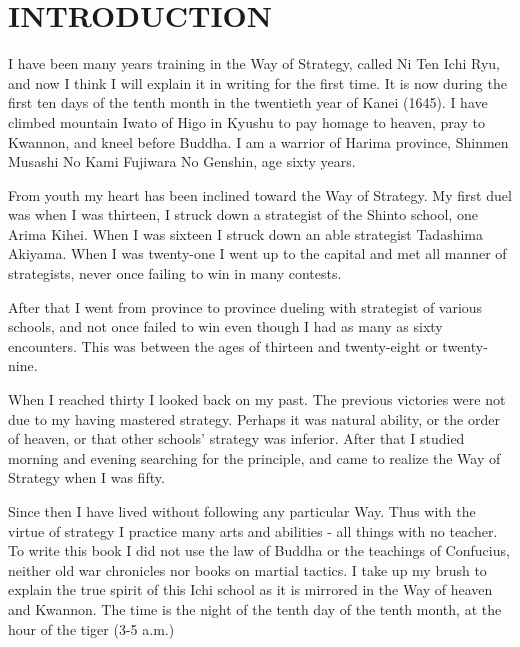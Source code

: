 \chapter{INTRODUCTION}

I have been many years training in the Way of Strategy, called Ni Ten Ichi Ryu, and now I think I will explain it in writing for the first time. It is now during the first ten days of the tenth month in the twentieth year of Kanei (1645). I have climbed mountain Iwato of Higo in Kyushu to pay homage to heaven, pray to Kwannon, and kneel before Buddha. I am a warrior of Harima province, Shinmen Musashi No Kami Fujiwara No Genshin, age sixty years.

From youth my heart has been inclined toward the Way of Strategy. My first duel was when I was thirteen, I struck down a strategist of the Shinto school, one Arima Kihei. When I was sixteen I struck down an able strategist Tadashima Akiyama. When I was twenty-one I went up to the capital and met all manner of strategists, never once failing to win in many contests.

After that I went from province to province dueling with strategist of various schools, and not once failed to win even though I had as many as sixty encounters. This was between the ages of thirteen and twenty-eight or twenty-nine.

When I reached thirty I looked back on my past. The previous victories were not due to my having mastered strategy. Perhaps it was natural ability, or the order of heaven, or that other schools' strategy was inferior. After that I studied morning and evening searching for the principle, and came to realize the Way of Strategy when I was fifty.

Since then I have lived without following any particular Way. Thus with the virtue of strategy I practice many arts and abilities - all things with no teacher. To write this book I did not use the law of Buddha or the teachings of Confucius, neither old war chronicles nor books on martial tactics. I take up my brush to explain the true spirit of this Ichi school as it is mirrored in the Way of heaven and Kwannon. The time is the night of the tenth day of the tenth month, at the hour of the tiger (3-5 a.m.) 
